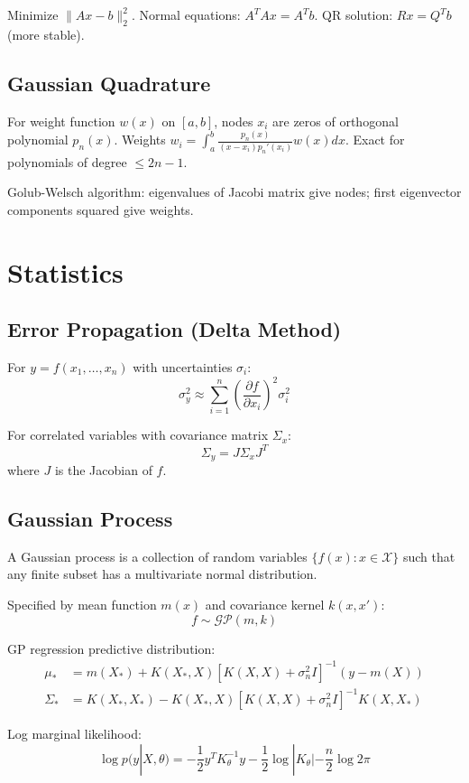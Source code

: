 Minimize $\|Ax - b\|_2^2$.
Normal equations: $A^T A x = A^T b$.
QR solution: $Rx = Q^T b$ (more stable).

\subsection{Gaussian Quadrature}

For weight function $w(x)$ on $[a,b]$, nodes $x_i$ are zeros of orthogonal polynomial $p_n(x)$.
Weights $w_i = \int_a^b \frac{p_n(x)}{(x-x_i)p_n'(x_i)} w(x) dx$.
Exact for polynomials of degree $\le 2n-1$.

Golub-Welsch algorithm: eigenvalues of Jacobi matrix give nodes; first eigenvector components squared give weights.

\section{Statistics}

\subsection{Error Propagation (Delta Method)}

For $y = f(x_1, \ldots, x_n)$ with uncertainties $\sigma_i$:
\[
\sigma_y^2 \approx \sum_{i=1}^n \left(\frac{\partial f}{\partial x_i}\right)^2 \sigma_i^2
\]

For correlated variables with covariance matrix $\Sigma_x$:
\[
\Sigma_y = J \Sigma_x J^T
\]
where $J$ is the Jacobian of $f$.

\subsection{Gaussian Process}

A Gaussian process is a collection of random variables $\{f(x) : x \in \mathcal{X}\}$ such that any finite subset has a multivariate normal distribution.

Specified by mean function $m(x)$ and covariance kernel $k(x, x')$:
\[
f \sim \mathcal{GP}(m, k)
\]

GP regression predictive distribution:
\begin{align*}
\mu_* &= m(X_*) + K(X_*, X) [K(X, X) + \sigma_n^2 I]^{-1} (y - m(X)) \\
\Sigma_* &= K(X_*, X_*) - K(X_*, X) [K(X, X) + \sigma_n^2 I]^{-1} K(X, X_*)
\end{align*}

Log marginal likelihood:
\[
\log p(y|X, \theta) = -\frac{1}{2} y^T K_\theta^{-1} y - \frac{1}{2} \log |K_\theta| - \frac{n}{2} \log 2\pi
\]

